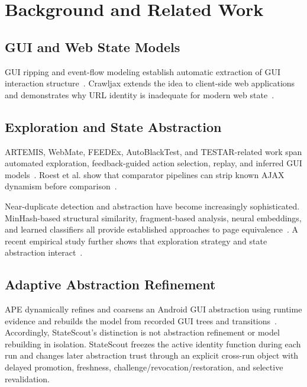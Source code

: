 \documentclass[conference]{IEEEtran}
\begin{document}
\section{Background and Related Work}
\subsection{GUI and Web State Models}
GUI ripping and event-flow modeling establish automatic extraction of GUI interaction structure~\cite{memon2003guiripping,memon2007eventflow}. Crawljax extends the idea to client-side web applications and demonstrates why URL identity is inadequate for modern web state~\cite{mesbah2008crawling,mesbah2012crawljax}.

\subsection{Exploration and State Abstraction}
ARTEMIS, WebMate, FEEDEx, AutoBlackTest, and TESTAR-related work span automated exploration, feedback-guided action selection, replay, and inferred GUI models~\cite{artzi2011framework,dallmeier2012webmate,fard2013feedback,mariani2014autoblacktest,mulders2022statemodel,pastorricos2023distributed}. Roest et al. show that comparator pipelines can strip known AJAX dynamism before comparison~\cite{roest2010regression}.

Near-duplicate detection and abstraction have become increasingly sophisticated. MinHash-based structural similarity, fragment-based analysis, neural embeddings, and learned classifiers all provide established approaches to page equivalence~\cite{benbassat2019minhash,yandrapally2023fraggen,kanaththage2026webembed,liu2026judge}. A recent empirical study further shows that exploration strategy and state abstraction interact~\cite{liu2026understanding}.

\subsection{Adaptive Abstraction Refinement}
APE dynamically refines and coarsens an Android GUI abstraction using runtime evidence and rebuilds the model from recorded GUI trees and transitions~\cite{gu2019ape}. Accordingly, StateScout's distinction is not abstraction refinement or model rebuilding in isolation. StateScout freezes the active identity function during each run and changes later abstraction trust through an explicit cross-run object with delayed promotion, freshness, challenge/revocation/restoration, and selective revalidation.
\end{document}
